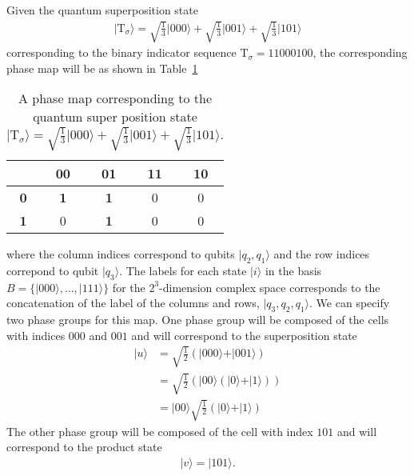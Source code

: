 \begin{example}
\label{exa:phasemap}
Given the quantum superposition state
\begin{align*}
	\vert \mathrm{T}_{\sigma} \rangle = \sqrt{\frac{1}{3}} \vert 000 \rangle + \sqrt{\frac{1}{3}} \vert 001 \rangle + \sqrt{\frac{1}{3}} \vert 101 \rangle
\end{align*}
corresponding to the binary indicator sequence $\mathrm{T}_{\sigma} = 11000100$, the corresponding phase map will be as shown in Table~\ref{tab:phase-map-sample}
\begin{table}[h!]
	\centering
	\begin{tabular}{| c || c | c | c | c |}
		\hline
		 \quad           & \textbf{00} & \textbf{01} & \textbf{11}  & \textbf{10}\\
		 \hline\hline
		 \textbf{0}    & \textbf{1}   & \textbf{1}   & 0                 & 0\\
		 \hline
		 \textbf{1}    & 0                & \textbf{1}   & 0                 & 0 \\
	     \hline
	\end{tabular}
	\caption{A phase map corresponding to the quantum super position state $\vert \mathrm{T}_{\sigma} \rangle = \sqrt{\frac{1}{3}} \vert 000 \rangle + \sqrt{\frac{1}{3}} \vert 001 \rangle + \sqrt{\frac{1}{3}} \vert 101 \rangle.$}
	\label{tab:phase-map-sample}
\end{table}
where the column indices correspond to qubits $\vert q_2,q_1 \rangle$ and the row indices correpond to qubit $\vert q_3 \rangle$. The labels for each state $\vert i \rangle$ in the basis $B=\{\vert 000 \rangle, \ldots, \vert 111 \rangle\}$ for the $2^3$-dimension complex space corresponds to the concatenation of the label of the columns and rows, $\vert q_3,q_2,q_1 \rangle$. We can specify two phase groups for this map. One phase group will be composed of the cells with indices $000$ and $001$ and will correspond to the superposition state
\begin{align*}
	\vert u \rangle &= \sqrt{\frac{1}{2}}\left( \vert 000 \rangle + \vert 001 \rangle \right)\\
						   &= \sqrt{\frac{1}{2}}\left( \vert 00 \rangle \left( \vert 0 \rangle   + \vert 1 \rangle \right) \right)\\
						   &= \vert 00 \rangle \sqrt{\frac{1}{2}}\left( \vert 0 \rangle + \vert 1 \rangle \right)
\end{align*} 
The other phase group will be composed of the cell with index $101$ and will correspond to the product state
\begin{align*}
	\vert v \rangle = \vert 101 \rangle.
\end{align*}
\end{example}
